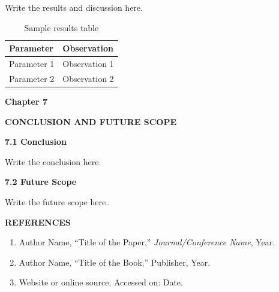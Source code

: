 \documentclass[12pt]{article}
\begin{document}
Write the results and discussion here.

\vspace{0.5cm}

\begin{table}[h!]
\centering
\renewcommand{\arraystretch}{1.4}
\begin{tabular}{|p{5cm}|p{5cm}|}
\hline
\textbf{Parameter} & \textbf{Observation} \\
\hline
Parameter 1 & Observation 1 \\
\hline
Parameter 2 & Observation 2 \\
\hline
\end{tabular}
\caption{Sample results table}
\label{tab:results}
\end{table}

\newpage

\begin{center}
\textbf{\Large Chapter 7}
\end{center}

\vspace{0.4cm}

\begin{center}
\textbf{\Large CONCLUSION AND FUTURE SCOPE}
\end{center}

\vspace{0.6cm}

\noindent
\textbf{7.1 Conclusion}

\vspace{0.25cm}

Write the conclusion here.

\vspace{0.5cm}

\noindent
\textbf{7.2 Future Scope}

\vspace{0.25cm}

Write the future scope here.

\newpage

\begin{center}
\textbf{\Large REFERENCES}
\end{center}

\vspace{0.6cm}

\begin{enumerate}
\item Author Name, ``Title of the Paper,'' \textit{Journal/Conference Name}, Year.
\item Author Name, ``Title of the Book,'' Publisher, Year.
\item Website or online source, Accessed on: Date.
\end{enumerate}
\end{document}
